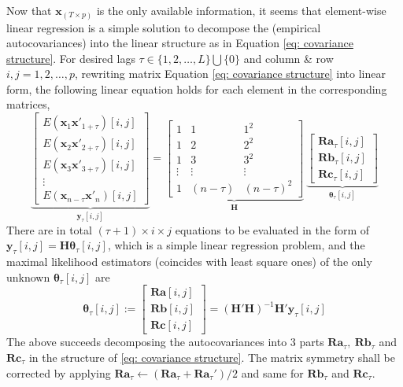 \documentclass[utf8,english]{gradu3}
\begin{document}
Now that $\boldsymbol{x}_{(T\times p)}$ is the only available information, it seems that element-wise linear regression is a simple solution to decompose the (empirical autocovariances) into the linear structure as in Equation \ref{eq: covariance structure}. For desired lags $\tau \in \{1,2,\dots, L\}\bigcup \{0\}$ and column \& row $i,j = 1,2,\dots,p$, rewriting matrix Equation \ref{eq: covariance structure} into linear form, the following linear equation holds for each element in the corresponding matrices,
\begin{equation}
\label{eq: element equal}
    \underbrace {\begin{bmatrix} E(\boldsymbol x_{1} \boldsymbol x'_{1+\tau})[i,j] \\ E(\boldsymbol x_{2} \boldsymbol x'_{2+\tau})[i,j] \\ E(\boldsymbol x_{3} \boldsymbol x'_{3+\tau})[i,j]  \\ \vdots \\ E(\boldsymbol x_{n-\tau} \boldsymbol x'_{n})[i,j] \end{bmatrix}}_{ \boldsymbol y_\tau [i,j]}
     = \underbrace{ \begin{bmatrix}  1 & 1 & 1^2 \\ 1 & 2 & 2^2\\  1 & 3 & 3^2\\ \vdots & \vdots & \vdots \\  1 & (n-\tau) & (n-\tau)^2 \end{bmatrix}  }_{ \boldsymbol H} \ 
    \underbrace{ \begin{bmatrix} \boldsymbol {Ra}_\tau[i,j] \\ \boldsymbol{Rb}_\tau[i,j] \\ \boldsymbol {Rc}_\tau[i,j] \end{bmatrix}  }_{ \boldsymbol \theta_\tau [i,j]} 
\end{equation}
There are in total $(\tau+1)\times i \times j$ equations to be evaluated in the form of $\boldsymbol{y}_\tau[i,j] = \boldsymbol{H\theta}_\tau[i,j]$, which is a simple linear regression problem, and the maximal likelihood estimators (coincides with least square ones) of the only unknown $\boldsymbol{\theta}_\tau[i,j]$ are
\begin{equation}
\label{eq: estimator of Rabc}
    \boldsymbol{\theta}_\tau[i,j]:= \begin{bmatrix} \boldsymbol {Ra}[i,j] \\ \boldsymbol {Rb}[i,j] \\ \boldsymbol {Rc}[i,j] \end{bmatrix} = ( \boldsymbol H ' \boldsymbol H)^{-1} \boldsymbol H' \boldsymbol y_\tau[i,j]
\end{equation}
The above succeeds decomposing the autocovariances into 3 parts $\boldsymbol{Ra}_\tau,\ \boldsymbol{Rb}_\tau$ and $\boldsymbol{Rc}_\tau$ in the structure of \ref{eq: covariance structure}. The matrix symmetry shall be corrected by applying $\boldsymbol{Ra}_\tau \leftarrow(\boldsymbol{Ra}_\tau + \boldsymbol{Ra}_\tau')/2$ and same for $\boldsymbol{Rb}_\tau$ and $\boldsymbol{Rc}_\tau$.
\end{document}
